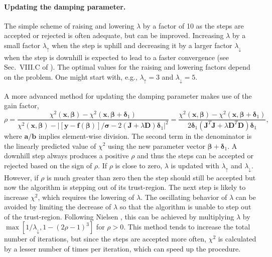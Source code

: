 \documentclass{article}
\begin{document}
\paragraph{Updating the damping parameter.} The simple scheme of
raising and lowering $\lambda$ by a factor of 10 as the steps are
accepted or rejected is often adequate, but can be
improved. Increasing $\lambda$ by a small factor $\lambda_\uparrow$
when the step is uphill and decreasing it by a larger factor
$\lambda_\downarrow$ when the step is downhill is expected to lead to
a faster convergence (see Sec.~VIII.C of \cite{transtrum11}). The
optimal values for the raising and lowering factors depend on the
problem. One might start with, e.g., $\lambda_\uparrow=3$ and
$\lambda_\downarrow=5$.

A more advanced method for updating the damping parameter makes use of
the gain factor,
\begin{equation}
  \label{eq:gain_factor}
  \rho = \frac{\chi^2(\bm x, \bm\beta) - \chi^2(\bm x,
    \bm\beta+\bm\delta_1)}{\chi^2(\bm x, \bm\beta) - \left| [\bm y
      - \bm f(\bm\beta)]/\bm\sigma - 2(\bm J+\lambda\bm
      D)\bm\delta_1 \right|^2} = \frac{\chi^2(\bm x, \bm\beta) -
    \chi^2(\bm x, \bm\beta+\bm\delta_1)}{2\bm\delta_1(\bm J^T\bm
    J+\lambda\bm D^T\bm D)\bm\delta_1},
\end{equation}
where $\bm a/\bm b$ implies element-wise division. The second term in
the denominator is the linearly predicted value of $\chi^2$ using the
new parameter vector $\bm\beta+\bm\delta_1$. A downhill step always
produces a positive $\rho$ and thus the steps can be accepted or
rejected based on the sign of $\rho$. If $\rho$ is close to zero,
$\lambda$ is updated with $\lambda_\uparrow$ and
$\lambda_\downarrow$. However, if $\rho$ is much greater than zero
then the step should still be accepted but now the algorithm is
stepping out of its trust-region. The next step is likely to increase
$\chi^2$, which requires the lowering of $\lambda$. The oscillating
behavior of $\lambda$ can be avoided by limiting the decrease of
$\lambda$ so that the algorithm is unable to step out of the
trust-region. Following Nielsen \cite{nielsen99}, this can be achieved
by multiplying $\lambda$ by $\max[1/\lambda_\downarrow,1-(2\rho-1)^3]$
for $\rho>0$. This method tends to increase the total number of
iterations, but since the steps are accepted more often, $\chi^2$ is
calculated by a lesser number of times per iteration, which can speed
up the procedure.
\end{document}
